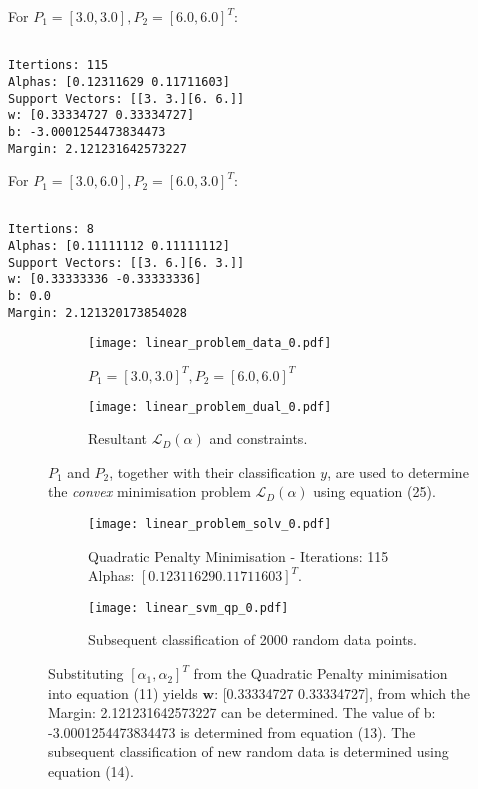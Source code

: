\documentclass[10pt, a4paper,reqno]{amsart}
\begin{document}
For $P_1 = [3.0, 3.0], P_2 = [6.0, 6.0]^T$:

\begin{verbatim}

Itertions: 115
Alphas: [0.12311629 0.11711603]
Support Vectors: [[3. 3.][6. 6.]]
w: [0.33334727 0.33334727]
b: -3.0001254473834473
Margin: 2.121231642573227

\end{verbatim}

For $P_1 = [3.0, 6.0], P_2 = [6.0, 3.0]^T$:

\begin{verbatim}

Itertions: 8
Alphas: [0.11111112 0.11111112]
Support Vectors: [[3. 6.][6. 3.]]
w: [0.33333336 -0.33333336]
b: 0.0
Margin: 2.121320173854028

\end{verbatim}

\begin{figure}[H]
	\centering	
	\begin{subfigure}{1.0\textwidth}
		\centering
		\texttt{[image: linear\_problem\_data\_0.pdf]}
		\caption{$P_1 = [3.0, 3.0]^T, P_2 = [6.0, 6.0]^T$}
	\end{subfigure}
	\begin{subfigure}{1.0\textwidth}
		\centering
		\texttt{[image: linear\_problem\_dual\_0.pdf]}
		\caption{Resultant $\mathcal{L}_D(\alpha)$ and constraints.}
	\end{subfigure}
	\caption{$P_1$ and $P_2$, together with their classification $y$, are used to determine the \emph{convex} minimisation problem $\mathcal{L}_D(\alpha)$ using equation (25).}
\end{figure}

\begin{figure}[H]
	\centering	
	\begin{subfigure}{1.0\textwidth}
		\centering
		\texttt{[image: linear\_problem\_solv\_0.pdf]}
		\caption{Quadratic Penalty Minimisation - Iterations: 115 Alphas: $[0.12311629 0.11711603]^T$.}
	\end{subfigure}
	\begin{subfigure}{1.0\textwidth}
		\centering
		\texttt{[image: linear\_svm\_qp\_0.pdf]}
		\caption{Subsequent classification of 2000 random data points.}
	\end{subfigure}
	\caption{Substituting $[\alpha_1, \alpha_2]^T$ from the Quadratic Penalty minimisation into equation (11) yields $\mathbf{w}$:
 [0.33334727 0.33334727], from which the Margin: 2.121231642573227 can be determined. The value of b: -3.0001254473834473 is determined from equation (13). The subsequent classification of new random data is determined using equation (14).}
\end{figure}
\end{document}
